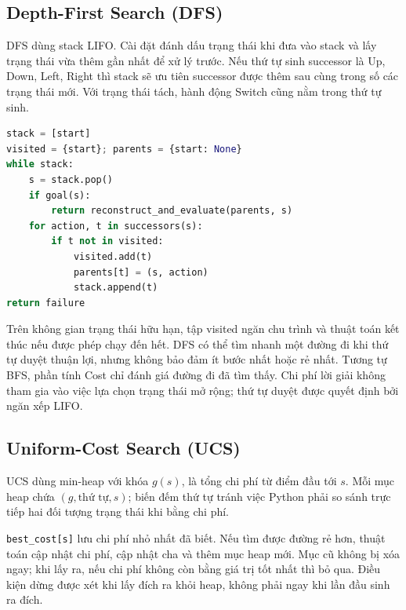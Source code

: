 \subsection{Depth-First Search (DFS)}
DFS dùng stack LIFO. Cài đặt đánh dấu trạng thái khi đưa vào stack và lấy trạng thái vừa thêm gần nhất để xử lý trước. Nếu thứ tự sinh successor là Up, Down, Left, Right thì stack sẽ ưu tiên successor được thêm sau cùng trong số các trạng thái mới. Với trạng thái tách, hành động Switch cũng nằm trong thứ tự sinh.

\noindent\begin{minipage}{\linewidth}
\begin{lstlisting}[language=Python,caption={Mã giả DFS theo cài đặt của nhóm}]
stack = [start]
visited = {start}; parents = {start: None}
while stack:
    s = stack.pop()
    if goal(s):
        return reconstruct_and_evaluate(parents, s)
    for action, t in successors(s):
        if t not in visited:
            visited.add(t)
            parents[t] = (s, action)
            stack.append(t)
return failure
\end{lstlisting}
\end{minipage}
Trên không gian trạng thái hữu hạn, tập visited ngăn chu trình và thuật toán kết thúc nếu được phép chạy đến hết. DFS có thể tìm nhanh một đường đi khi thứ tự duyệt thuận lợi, nhưng không bảo đảm ít bước nhất hoặc rẻ nhất. Tương tự BFS, phần tính Cost chỉ đánh giá đường đi đã tìm thấy. Chi phí lời giải không tham gia vào việc lựa chọn trạng thái mở rộng; thứ tự duyệt được quyết định bởi ngăn xếp LIFO.

\subsection{Uniform-Cost Search (UCS)}
UCS dùng min-heap với khóa $g(s)$, là tổng chi phí từ điểm đầu tới $s$. Mỗi mục heap chứa $(g,\text{thứ tự},s)$; biến đếm thứ tự tránh việc Python phải so sánh trực tiếp hai đối tượng trạng thái khi bằng chi phí.

\texttt{best\_cost[s]} lưu chi phí nhỏ nhất đã biết. Nếu tìm được đường rẻ hơn, thuật toán cập nhật chi phí, cập nhật cha và thêm mục heap mới. Mục cũ không bị xóa ngay; khi lấy ra, nếu chi phí không còn bằng giá trị tốt nhất thì bỏ qua. Điều kiện dừng được xét khi lấy đích ra khỏi heap, không phải ngay khi lần đầu sinh ra đích.


